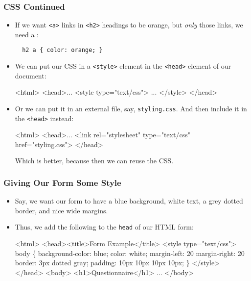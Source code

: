 \documentclass[dvipsnames]{beamer}
\begin{document}
\begin{frame}[fragile=singleslide]
  \frametitle{CSS Continued}

  \begin{itemize}
  \item If we want \texttt{<a>} links in \texttt{<h2>} headings to be
    orange, but \emph{only} those links, we need a :
    \begin{small}
\begin{verbatim}
  h2 a { color: orange; }
\end{verbatim}
    \end{small}

  \item We can put our CSS in a \texttt{<style>} element in the
    \texttt{<head>} element of our document:
    \begin{footnotesize}\color{gray}
\begin{semiverbatim}
  <html>
  <head>...
    {\color{black}<style type="text/css">
      ...
    </style>}
  </head>
\end{semiverbatim}
    \end{footnotesize}
  \item Or we can put it in an external file, say,
    \texttt{styling.css}.  And then include it in the \texttt{<head>}
    instead:
    \begin{footnotesize}\color{gray}
\begin{semiverbatim}
  <html>
  <head>...
    {\color{black}<link rel="stylesheet" type="text/css" href="styling.css">}
  </head>
\end{semiverbatim}
    \end{footnotesize}
    Which is better, because then we can reuse the CSS.
  \end{itemize}
\end{frame}



\begin{frame}[fragile]
  \frametitle{Giving Our Form Some Style}
  
  \begin{itemize}
  \item Say, we want our form to have a blue background, white text, a
    grey dotted border, and nice wide margins.

  \item Thus, we add the following  to the
    \texttt{head} of our HTML form:
    \begin{footnotesize}\color{gray}
\begin{semiverbatim}
<html>
<head><title>Form Example</title>
{\color{black}<style type="text/css">
  body \{ background-color: blue;
         color: white;
         margin-left: 20%
         margin-right: 20%
         border: 3px dotted gray;
         padding: 10px 10px 10px 10px;
  \}
</style>}
</head>
<body>
<h1>Questionnaire</h1>
...
</body>
\end{semiverbatim}
    \end{footnotesize}
  \end{itemize}
\end{frame}
\end{document}
